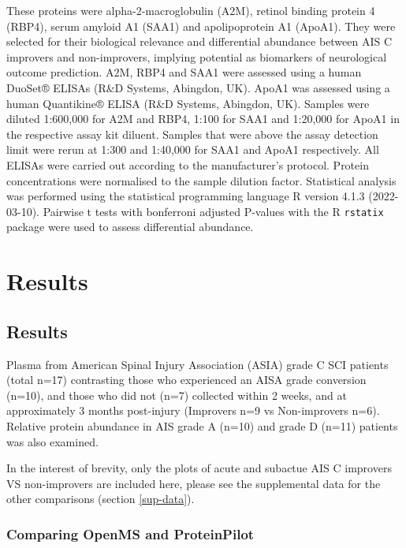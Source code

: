 \documentclass[9pt,lineno]{elife}
\begin{document}
These proteins were alpha-2-macroglobulin (A2M), retinol binding protein 4 (RBP4), serum amyloid A1 (SAA1) and apolipoprotein A1 (ApoA1).
They were selected for their biological relevance and differential abundance between AIS C improvers and non-improvers, implying potential as biomarkers of neurological outcome prediction.
A2M, RBP4 and SAA1 were assessed using a human DuoSet® ELISAs (R\&D Systems, Abingdon, UK).
ApoA1 was assessed using a human Quantikine® ELISA (R\&D Systems, Abingdon, UK).
Samples were diluted 1:600,000 for A2M and RBP4, 1:100 for SAA1 and 1:20,000 for ApoA1 in the respective assay kit diluent.
Samples that were above the assay detection limit were rerun at 1:300 and 1:40,000 for SAA1 and ApoA1 respectively.
All ELISAs were carried out according to the manufacturer's protocol.
Protein concentrations were normalised to the sample dilution factor.
Statistical analysis was performed using the statistical programming language R version 4.1.3 (2022-03-10).
Pairwise t tests with bonferroni adjusted P-values with the R \texttt{rstatix} package were used to assess differential abundance.

\hypertarget{results-1}{%
\section{Results}\label{results-1}}

\hypertarget{chap-3-results}{%
\subsection{Results}\label{chap-3-results}}

Plasma from American Spinal Injury Association (ASIA) grade C SCI patients (total n=17) contrasting those who experienced an AISA grade conversion (n=10), and those who did not (n=7) collected within 2 weeks, and at approximately 3 months post-injury (Improvers n=9 vs Non-improvers n=6).
Relative protein abundance in AIS grade A (n=10) and grade D (n=11) patients was also examined.

In the interest of brevity, only the plots of acute and subactue AIS C improvers VS non-improvers are included here, please see the supplemental data for the other comparisons (section \ref{sup-data}).

\hypertarget{comparing-openms-and-proteinpilot}{%
\subsubsection{Comparing OpenMS and ProteinPilot}\label{comparing-openms-and-proteinpilot}}
\end{document}
